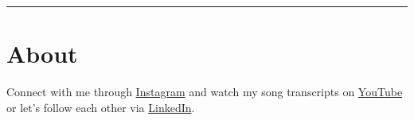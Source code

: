 \documentclass[
]{book}
\begin{document}
\begin{center}\rule{0.5\linewidth}{0.5pt}\end{center}

\hypertarget{About}{%
\chapter{About}\label{About}}

Connect with me through \href{https://www.instagram.com/isaac.medina/}{Instagram} and watch my song transcripts on \href{https://www.youtube.com/@drumathics}{YouTube} or let's follow each other via \href{https://mx.linkedin.com/in/isaacmedina/es}{LinkedIn}.

  
\end{document}
